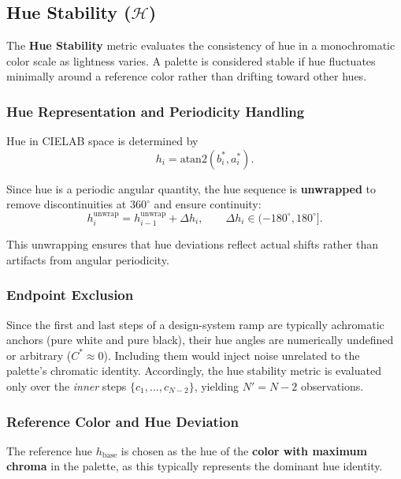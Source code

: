 \subsection{Hue Stability ($\mathcal{H}$)}

The \textbf{Hue Stability} metric evaluates the consistency of hue in a monochromatic
color scale as lightness varies. A palette is considered stable if hue fluctuates
minimally around a reference color rather than drifting toward other hues.

\subsubsection{Hue Representation and Periodicity Handling}

Hue in CIELAB space is determined by
\begin{equation}
h_i = \mathrm{atan2}(b^*_i, a^*_i).
\end{equation}

Since hue is a periodic angular quantity, the hue sequence is \textbf{unwrapped}
to remove discontinuities at $360^\circ$ and ensure continuity:
\begin{equation}
h^{\mathrm{unwrap}}_i =
h^{\mathrm{unwrap}}_{i-1} + \Delta h_i,
\qquad
\Delta h_i \in (-180^\circ, 180^\circ].
\end{equation}

This unwrapping ensures that hue deviations reflect actual shifts rather than
artifacts from angular periodicity.

\subsubsection{Endpoint Exclusion}

Since the first and last steps of a design-system ramp are typically achromatic
anchors (pure white and pure black), their hue angles are numerically undefined
or arbitrary ($C^* \approx 0$). Including them would inject noise unrelated to
the palette's chromatic identity. Accordingly, the hue stability metric is
evaluated only over the \emph{inner} steps $\{c_1, \dots, c_{N-2}\}$, yielding
$N' = N - 2$ observations.

\subsubsection{Reference Color and Hue Deviation}

The reference hue $h_{\mathrm{base}}$ is chosen as the hue of the
\textbf{color with maximum chroma} in the palette, as this typically represents
the dominant hue identity.

